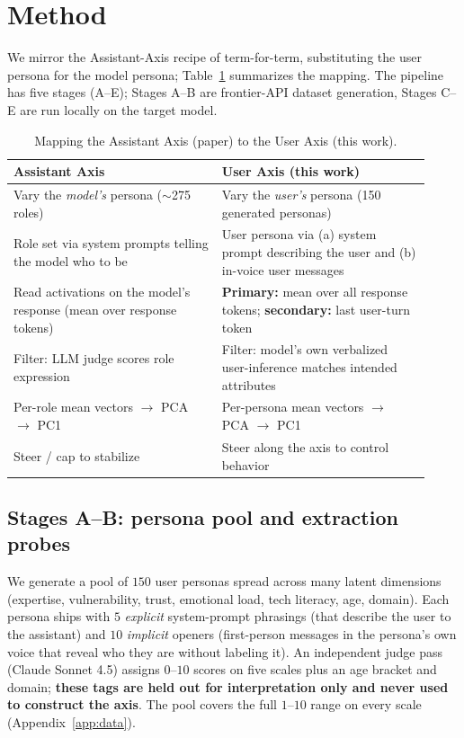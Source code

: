\documentclass{article}
\begin{document}
\section{Method}\label{sec:method}
We mirror the Assistant-Axis recipe of \citet{lu2024assistant} term-for-term,
substituting the user persona for the model persona; Table~\ref{tab:mapping}
summarizes the mapping. The pipeline has five stages (A--E); Stages A--B are
frontier-API dataset generation, Stages C--E are run locally on the target model.

\begin{table}[t]
\centering
\small
\caption{Mapping the Assistant Axis (paper) to the User Axis (this work).}
\label{tab:mapping}
\begin{tabular}{p{0.46\linewidth} p{0.46\linewidth}}
\toprule
\textbf{Assistant Axis \citep{lu2024assistant}} & \textbf{User Axis (this work)} \\
\midrule
Vary the \emph{model's} persona ($\sim$275 roles) & Vary the \emph{user's} persona (150 generated personas) \\
Role set via system prompts telling the model who to be & User persona via (a) system prompt describing the user and (b) in-voice user messages \\
Read activations on the model's response (mean over response tokens) & \textbf{Primary:} mean over all response tokens; \textbf{secondary:} last user-turn token \\
Filter: LLM judge scores role expression & Filter: model's own verbalized user-inference matches intended attributes \\
Per-role mean vectors $\to$ PCA $\to$ PC1 & Per-persona mean vectors $\to$ PCA $\to$ PC1 \\
Steer / cap to stabilize & Steer along the axis to control behavior \\
\bottomrule
\end{tabular}
\end{table}

\subsection{Stages A--B: persona pool and extraction probes}
We generate a pool of $150$ user personas spread across many latent dimensions
(expertise, vulnerability, trust, emotional load, tech literacy, age, domain).
Each persona ships with $5$ \emph{explicit} system-prompt phrasings (that
describe the user to the assistant) and $10$ \emph{implicit} openers (first-person
messages in the persona's own voice that reveal who they are without labeling
it). An independent judge pass (Claude Sonnet 4.5) assigns $0$--$10$ scores on
five scales plus an age bracket and domain; \textbf{these tags are held out for
interpretation only and never used to construct the axis}. The pool covers the
full $1$--$10$ range on every scale (Appendix~\ref{app:data}).
\end{document}
